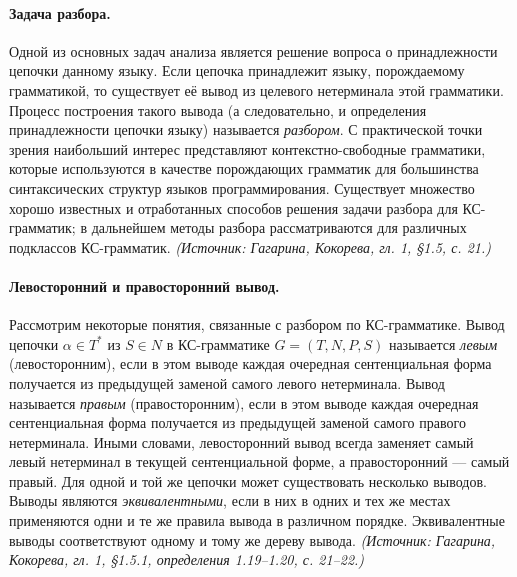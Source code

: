 \documentclass[a4paper,12pt]{article}
\begin{document}
\paragraph{Задача разбора.}
Одной из основных задач анализа является решение вопроса о принадлежности цепочки данному языку. Если цепочка принадлежит языку, порождаемому грамматикой, то существует её вывод из целевого нетерминала этой грамматики. Процесс построения такого вывода (а следовательно, и определения принадлежности цепочки языку) называется \emph{разбором}. С практической точки зрения наибольший интерес представляют контекстно-свободные грамматики, которые используются в качестве порождающих грамматик для большинства синтаксических структур языков программирования. Существует множество хорошо известных и отработанных способов решения задачи разбора для КС-грамматик; в дальнейшем методы разбора рассматриваются для различных подклассов КС-грамматик.
\textit{(Источник: Гагарина, Кокорева, гл. 1, §1.5, с. 21.)}

\paragraph{Левосторонний и правосторонний вывод.}
Рассмотрим некоторые понятия, связанные с разбором по КС-грамматике. Вывод цепочки \(\alpha\in T^*\) из \(S\in N\) в КС-грамматике \(G=(T,N,P,S)\) называется \emph{левым} (левосторонним), если в этом выводе каждая очередная сентенциальная форма получается из предыдущей заменой самого левого нетерминала. Вывод называется \emph{правым} (правосторонним), если в этом выводе каждая очередная сентенциальная форма получается из предыдущей заменой самого правого нетерминала. Иными словами, левосторонний вывод всегда заменяет самый левый нетерминал в текущей сентенциальной форме, а правосторонний — самый правый. Для одной и той же цепочки может существовать несколько выводов. Выводы являются \emph{эквивалентными}, если в них в одних и тех же местах применяются одни и те же правила вывода в различном порядке. Эквивалентные выводы соответствуют одному и тому же дереву вывода.
\textit{(Источник: Гагарина, Кокорева, гл. 1, §1.5.1, определения 1.19--1.20, с. 21--22.)}
\end{document}
